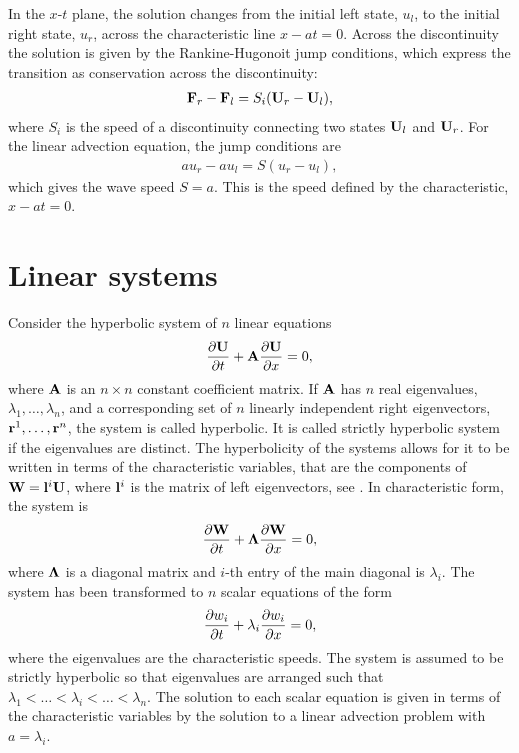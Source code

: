 In the $x$-$t$ plane, the solution changes from the initial left state, $u_l$, to the initial right state, $u_r$, across the characteristic line $x - at = 0$.  Across the discontinuity the solution is given by the Rankine-Hugonoit jump conditions, which express the transition as conservation across the discontinuity:
\begin{gather}
\label{eqn:rh_jump}
\mathbf{F}_r - \mathbf{F}_l = S_i (\mathbf{U}_r - \mathbf{U}_l),
\end{gather}      
where $S_i$ is the speed of a discontinuity connecting two states $\mathbf{U}_l$ and $\mathbf{U}_r$.  For the linear advection equation, the jump conditions are
\begin{gather*}
a u_r - a u_l = S (u_r - u_l),
\end{gather*}      
which gives the wave speed $S = a$.  This is the speed defined by the characteristic, $x - at = 0$.

\section[Linear systems]{Linear systems}
\label{sec:lin_sys}

Consider the hyperbolic system of $n$ linear equations
\begin{gather}
\label{eqn:linear_sys}
\frac{\partial \mathbf{U}}{\partial t} + \mathbf{A}\frac{\partial \mathbf{U}}{\partial x} = 0,
\end{gather}
where $\mathbf{A}$ is an $n \times n$ constant coefficient matrix.  If $\mathbf{A}$ has $n$ real eigenvalues, $\lambda_1, \hdots, \lambda_n$, and a corresponding set of $n$ linearly independent right eigenvectors, $\mathbf{r}^1,\hdots,\mathbf{r}^n$, the system is called hyperbolic.  It is called strictly hyperbolic system if the eigenvalues are distinct.  The hyperbolicity of the systems allows for it to be written in terms of the characteristic variables, that are the components of $\mathbf{W} = \mathbf{l}^i \mathbf{U}$, where $\mathbf{l}^i$ is the matrix of left eigenvectors, see \citep{Toro:1999}.  In characteristic form, the system is 
\begin{gather}
\frac{\partial \mathbf{W}}{\partial t} + \mathbf{\Lambda} \frac{\partial \mathbf{W}}{\partial x} = 0,
\end{gather}  
where $\mathbf{\Lambda}$ is a diagonal matrix and  $i$-th entry of the main diagonal is $\lambda_i$.
The system has been transformed to $n$ scalar equations of the form
\begin{gather}
\frac{\partial w_i}{\partial t} + \lambda_i \frac{\partial w_i}{\partial x} = 0,
\end{gather}  
where the eigenvalues are the characteristic speeds.  The system is assumed to be strictly hyperbolic so that eigenvalues are arranged such that ${\lambda_1 < \hdots < \lambda_i < \hdots < \lambda_n}$.  The solution to each scalar equation is given in terms of the characteristic variables by the solution to a linear advection problem with $a = \lambda_i$. 

